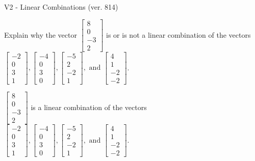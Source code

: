 \begin{exercise}
  \begin{exerciseTitle}V2 - Linear Combinations (ver. 814)\end{exerciseTitle}
  \begin{exerciseStatement}
    Explain why the vector \(\left[\begin{array}{c}
8 \\
0 \\
-3 \\
2
\end{array}\right]\)  is or is not a linear 
	combination of the vectors \(\left[\begin{array}{c}
-2 \\
0 \\
3 \\
1
\end{array}\right] , \left[\begin{array}{c}
-4 \\
0 \\
3 \\
0
\end{array}\right] , \left[\begin{array}{c}
-5 \\
2 \\
-2 \\
1
\end{array}\right] , \text{ and } \left[\begin{array}{c}
4 \\
1 \\
-2 \\
-2
\end{array}\right]\).
	


  \end{exerciseStatement}
  \begin{exerciseAnswer}
   \(\left[\begin{array}{c}
8 \\
0 \\
-3 \\
2
\end{array}\right]\) 
  	 is  
	a linear combination of the vectors \(\left[\begin{array}{c}
-2 \\
0 \\
3 \\
1
\end{array}\right] , \left[\begin{array}{c}
-4 \\
0 \\
3 \\
0
\end{array}\right] , \left[\begin{array}{c}
-5 \\
2 \\
-2 \\
1
\end{array}\right] , \text{ and } \left[\begin{array}{c}
4 \\
1 \\
-2 \\
-2
\end{array}\right]\).


\end{exerciseAnswer}
\end{exercise}
